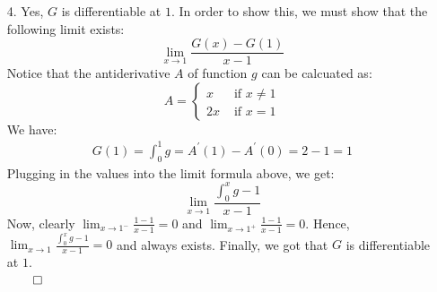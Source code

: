 \documentclass[11pt]{article}
\begin{document}
\begin{itemize}
    \item[4.]
        Yes, $G$ is differentiable at $1$. In order to show this, we must show
        that the following limit exists:
        \begin{equation*}
            \lim_{x \to 1} \frac{G(x) - G(1)}{x - 1}
        \end{equation*}
        Notice that the antiderivative $A$ of function $g$ can be calcuated as:
        \begin{equation*}
            A =
            \begin{cases}
                x  &\text{ if } x \neq 1\\
                2x &\text{ if } x = 1
            \end{cases}
        \end{equation*}
        We have:
        \begin{align*}
            G(1) = \int_0^1 g = A^\prime(1) - A^\prime(0) = 2 - 1 = 1
        \end{align*}
        Plugging in the values into the limit formula above, we get:
        \begin{equation*}
            \lim_{x \to 1} \frac{\int_0^x g - 1}{x - 1}
        \end{equation*}
        Now, clearly $\lim_{x \to 1^-} \frac{1 - 1}{x - 1} = 0$ and $\lim_{x
        \to 1^+} \frac{1 - 1}{x - 1} = 0$. Hence, $\lim_{x \to 1}
        \frac{\int_0^x g - 1}{x - 1} = 0$ and always exists. Finally, we got
        that $G$ is differentiable at $1$.\\
        $\qed$


\end{itemize}
\end{document}
